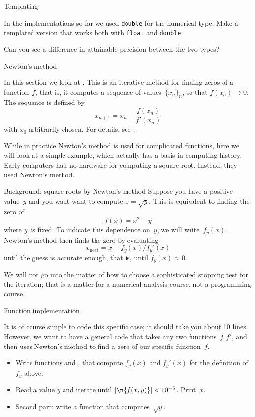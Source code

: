  {Templating}

In the implementations so far we used \lstinline{double}
for the numerical type.
Make a templated version that works both with \lstinline{float}
and \lstinline{double}.

Can you see a difference in attainable precision
between the two types?

 {Newton's method}
\label{sec:newton}


In this section we look at .
This is an iterative method for finding zeros of a function~$f$,
that is, it computes a sequence of values~$\{x_n\}_n$,
so that $f(x_n)\rightarrow 0$.
The sequence is defined by
\[ x_{n+1} = x_n - \frac{f(x_n)}{f'(x_n)} \]
with $x_0$ arbitrarily chosen.
For details, see .

While in practice Newton's method is used for
complicated functions, here we will look at
a simple example, which actually has a basis in computing history.
Early computers had no hardware for computing a square
root. Instead, they used Newton's method.

\begin{block}{Background: square roots by Newton's method}
  \label{sl:newton-root}
  Suppose you
  have a positive value~$y$ and you want want to compute
  $x=\sqrt{y}$. This is equivalent to finding the zero of
  \[ f(x) = x^2-y \] where $y$~is fixed. To indicate this dependence
  on~$y$, we will write~$f_y(x)$. Newton's method then finds the zero by
  evaluating
  \[ x_{\mathrm{next}}=x-f_y(x)/f_y'(x) \]
  until the guess is accurate enough, that is, until $f_y(x)\approx0$.
\end{block}

We will not go into the matter of how to choose a sophisticated
stopping test for the iteration; that is a matter
for a numerical analysis course, not a programming course.

 {Function implementation}

It is of course simple to code this specific case;
it should take you about 10 lines.
However, we want to have a general code
that takes any two functions~$f,f'$,
and then uses Newton's method to find a zero of
our specific function~$f$.

\begin{exercise}
  \label{ex:newton-root}
  \begin{itemize}
  \item Write functions  and , that compute
    $f_y(x)$ and $f_y'(x)$ for the definition of $f_y$ above.
  \item Read a value $y$ and iterate until $|\n{f(x,y)}|<10^{-5}$. Print~$x$.
  \item Second part: write a function  that computes~$\sqrt{y}$.
  \end{itemize}
\end{exercise}


